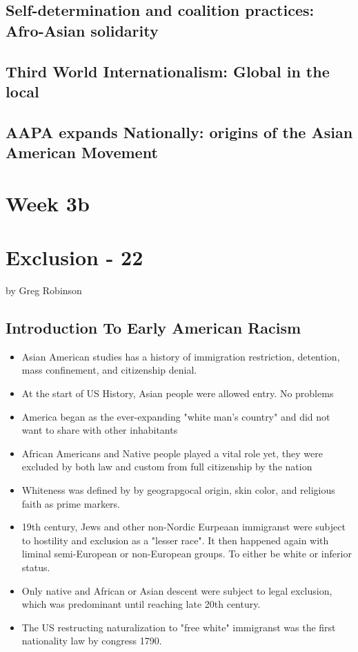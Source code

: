 \documentclass{article}
\begin{document}
\subsection{Self-determination and coalition practices: Afro-Asian solidarity}

\subsection{Third World Internationalism: Global in the local}

\subsection{AAPA expands Nationally: origins of the Asian American Movement}

\pagebreak

\section*{Week 3b}

\section{Exclusion - 22}
by Greg Robinson

\subsection{Introduction To Early American Racism}
\begin{itemize}
  \item Asian American studies has a history of immigration restriction,
    detention, mass confinement, and citizenship denial.
  \item At the start of US History, Asian people were allowed entry. No problems
  \item America began as the ever-expanding "white man's country" and 
    did not want to share with other inhabitants
  \item African Americans and Native people played a vital role yet, they were
    excluded by both law and custom from full citizenship by the nation
  \item Whiteness was defined by by geograpgocal origin,
    skin color, and religious faith as prime markers.
  \item 19th century, Jews and other non-Nordic Eurpeaan immigranst were  
    subject to hostility and exclusion as a "lesser race".
    It then happened again with liminal semi-European or non-European groups.
    To either be white or inferior status.
  \item Only native and African or Asian descent were subject to legal exclusion,
    which was predominant until reaching late 20th century.
  \item The US restructing naturalization to "free white" immigranst
    was the first nationality law by congress 1790.
\end{itemize}
  
\end{document}
